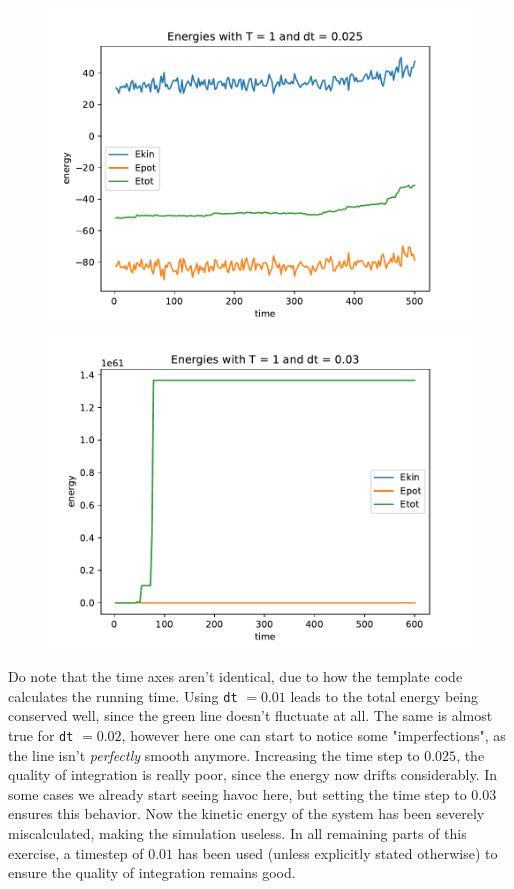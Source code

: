 \documentclass[a4paper,12pt]{article}
\begin{document}
\begin{figure}[!ht]
  \centering
  \begin{minipage}{0.49\textwidth}
    \includegraphics[width=\textwidth]{img/3_2a_dt0025.pdf}
  \end{minipage}
  \begin{minipage}{0.49\textwidth}
    \includegraphics[width=\textwidth]{img/3_2a_dt003.pdf}
  \end{minipage}
\end{figure}

\FloatBarrier

Do note that the time axes aren't identical, due to how the template code calculates the running time. Using
\texttt{dt} $= 0.01$ leads to the total energy being conserved well, since the green line doesn't fluctuate at all.
The same is almost true for \texttt{dt} $= 0.02$, however here one can start to notice some "imperfections", as the
line isn't \emph{perfectly} smooth anymore. Increasing the time step to $0.025$, the quality of integration is really
poor, since the energy now drifts considerably. In some cases we already start seeing havoc here, but setting the time
step to $0.03$ ensures this behavior. Now the kinetic energy of the system has been severely miscalculated, making the
simulation useless. In all remaining parts of this exercise, a timestep of $0.01$ has been used (unless explicitly
stated otherwise) to ensure the quality of integration remains good.
\end{document}
